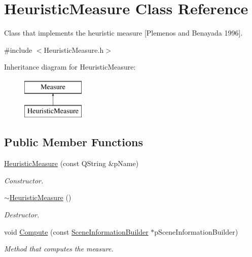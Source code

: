 \hypertarget{class_heuristic_measure}{\section{Heuristic\+Measure Class Reference}
\label{class_heuristic_measure}
}


Class that implements the heuristic measure \mbox{[}Plemenos and Benayada 1996\mbox{]}.  




{\ttfamily \#include $<$Heuristic\+Measure.\+h$>$}

Inheritance diagram for Heuristic\+Measure\+:\begin{figure}[H]
\begin{center}
\leavevmode
\includegraphics[height=2.000000cm]{class_heuristic_measure}
\end{center}
\end{figure}
\subsection*{Public Member Functions}
\begin{DoxyCompactItemize}
\item 
\hyperlink{class_heuristic_measure_aa761425caa28f9632901f2a2eee75405}{Heuristic\+Measure} (const Q\+String \&p\+Name)
\begin{DoxyCompactList}\small\item\em Constructor. \end{DoxyCompactList}\item 
\hyperlink{class_heuristic_measure_a09869bc51329d9db72dd88d516761b19}{$\sim$\+Heuristic\+Measure} ()
\begin{DoxyCompactList}\small\item\em Destructor. \end{DoxyCompactList}\item 
void \hyperlink{class_heuristic_measure_a9229f19bade89fd66160b4dbee877c8f}{Compute} (const \hyperlink{class_scene_information_builder}{Scene\+Information\+Builder} $\ast$p\+Scene\+Information\+Builder)
\begin{DoxyCompactList}\small\item\em Method that computes the measure. \end{DoxyCompactList}\end{DoxyCompactItemize}
